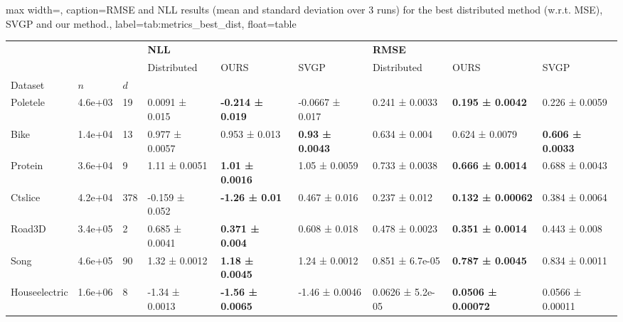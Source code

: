 \begin{adjustbox}{max width=\textwidth, caption={RMSE and NLL results (mean and standard deviation over 3 runs) for the best distributed method (w.r.t. MSE), SVGP and our method.}, 
label={tab:metrics_best_dist}, float=table}
\begin{tabular}{lllllllll}
\toprule
 &  &  & \multicolumn{3}{l}{\textbf{NLL}} & \multicolumn{3}{l}{\textbf{RMSE}} \\
 &  &  & Distributed & OURS & SVGP & Distributed & OURS & SVGP \\
Dataset & \(n\) & \(d\) &  &  &  &  &  &  \\
\midrule
Poletele & 4.6e+03 & 19 & 0.0091 ± 0.015 & \bfseries -0.214 ± 0.019 & -0.0667 ± 0.017 & 0.241 ± 0.0033 & \bfseries 0.195 ± 0.0042 & 0.226 ± 0.0059 \\
Bike & 1.4e+04 & 13 & 0.977 ± 0.0057 & 0.953 ± 0.013 & \bfseries 0.93 ± 0.0043 & 0.634 ± 0.004 & 0.624 ± 0.0079 & \bfseries 0.606 ± 0.0033 \\
Protein & 3.6e+04 & 9 & 1.11 ± 0.0051 & \bfseries 1.01 ± 0.0016 & 1.05 ± 0.0059 & 0.733 ± 0.0038 & \bfseries 0.666 ± 0.0014 & 0.688 ± 0.0043 \\
Ctslice & 4.2e+04 & 378 & -0.159 ± 0.052 & \bfseries -1.26 ± 0.01 & 0.467 ± 0.016 & 0.237 ± 0.012 & \bfseries 0.132 ± 0.00062 & 0.384 ± 0.0064 \\
Road3D & 3.4e+05 & 2 & 0.685 ± 0.0041 & \bfseries 0.371 ± 0.004 & 0.608 ± 0.018 & 0.478 ± 0.0023 & \bfseries 0.351 ± 0.0014 & 0.443 ± 0.008 \\
Song & 4.6e+05 & 90 & 1.32 ± 0.0012 & \bfseries 1.18 ± 0.0045 & 1.24 ± 0.0012 & 0.851 ± 6.7e-05 & \bfseries 0.787 ± 0.0045 & 0.834 ± 0.0011 \\
Houseelectric & 1.6e+06 & 8 & -1.34 ± 0.0013 & \bfseries -1.56 ± 0.0065 & -1.46 ± 0.0046 & 0.0626 ± 5.2e-05 & \bfseries 0.0506 ± 0.00072 & 0.0566 ± 0.00011 \\
\bottomrule
\end{tabular}
\end{adjustbox}

